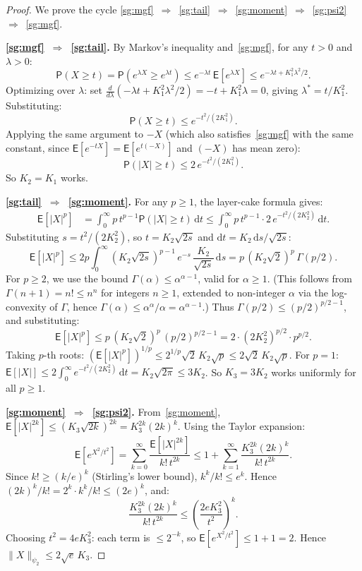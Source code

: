 \documentclass[14pt]{extarticle}
\theoremstyle{plain}
\theoremstyle{definition}
\theoremstyle{remark}
\newcommand\expc{\mathsf{E}}
\newcommand\prb{\mathsf{P}}
\newcommand{\dd}{\mathrm{d}}
\begin{document}
\begin{proof}
We prove the cycle \ref{sg:mgf}~$\Rightarrow$~\ref{sg:tail}~$\Rightarrow$~\ref{sg:moment}~$\Rightarrow$~\ref{sg:psi2}~$\Rightarrow$~\ref{sg:mgf}.

\medskip\noindent\textbf{\ref{sg:mgf}~$\Rightarrow$~\ref{sg:tail}.} By Markov's inequality and~\ref{sg:mgf}, for any $t > 0$ and $\lambda > 0$:
\[
\prb(X \geqslant t) = \prb(e^{\lambda X} \geqslant e^{\lambda t}) \leqslant e^{-\lambda t}\,\expc[e^{\lambda X}] \leqslant e^{-\lambda t + K_1^2\lambda^2/2}.
\]
Optimizing over $\lambda$: set $\frac{d}{d\lambda}(-\lambda t + K_1^2\lambda^2/2) = -t + K_1^2\lambda = 0$, giving $\lambda^* = t/K_1^2$. Substituting:
\[
\prb(X \geqslant t) \leqslant e^{-t^2/(2K_1^2)}.
\]
Applying the same argument to $-X$ (which also satisfies~\ref{sg:mgf} with the same constant, since $\expc[e^{-tX}] = \expc[e^{t(-X)}]$ and $(-X)$ has mean zero):
\[
\prb(|X| \geqslant t) \leqslant 2\,e^{-t^2/(2K_1^2)}.
\]
So $K_2 = K_1$ works.

\medskip\noindent\textbf{\ref{sg:tail}~$\Rightarrow$~\ref{sg:moment}.} For any $p \geqslant 1$, the layer-cake formula gives:
\begin{align}
\expc[|X|^p] &= \int_0^\infty p\,t^{p-1}\prb(|X| \geqslant t)\,\dd t \leqslant \int_0^\infty p\,t^{p-1} \cdot 2\,e^{-t^2/(2K_2^2)}\,\dd t. \label{eq:layercake}
\end{align}
Substituting $s = t^2/(2K_2^2)$, so $t = K_2\sqrt{2s}$ and $\dd t = K_2\,\dd s/\sqrt{2s}$:
\[
\expc[|X|^p] \leqslant 2p \int_0^\infty (K_2\sqrt{2s})^{p-1}\,e^{-s}\,\frac{K_2}{\sqrt{2s}}\,\dd s = p\,(K_2\sqrt{2})^p\,\Gamma(p/2).
\]
For $p \geqslant 2$, we use the bound $\Gamma(\alpha) \leqslant \alpha^{\alpha-1}$, valid for $\alpha \geqslant 1$. (This follows from $\Gamma(n+1) = n! \leqslant n^n$ for integers $n \geqslant 1$, extended to non-integer $\alpha$ via the log-convexity of $\Gamma$, hence $\Gamma(\alpha) \leqslant \alpha^\alpha/\alpha = \alpha^{\alpha-1}$.) Thus $\Gamma(p/2) \leqslant (p/2)^{p/2-1}$, and substituting:
\[
\expc[|X|^p] \leqslant p\,(K_2\sqrt{2})^p\,(p/2)^{p/2-1} = 2\cdot(2K_2^2)^{p/2}\cdot p^{p/2}.
\]
Taking $p$-th roots: $(\expc[|X|^p])^{1/p} \leqslant 2^{1/p}\sqrt{2}\,K_2\sqrt{p} \leqslant 2\sqrt{2}\,K_2\sqrt{p}$. For $p = 1$: $\expc[|X|] \leqslant 2\int_0^\infty e^{-t^2/(2K_2^2)}\,\dd t = K_2\sqrt{2\pi} \leqslant 3K_2$. So $K_3 = 3K_2$ works uniformly for all $p \geqslant 1$.

\medskip\noindent\textbf{\ref{sg:moment}~$\Rightarrow$~\ref{sg:psi2}.} From~\ref{sg:moment}, $\expc[|X|^{2k}] \leqslant (K_3\sqrt{2k})^{2k} = K_3^{2k}(2k)^k$. Using the Taylor expansion:
\[
\expc\!\left[e^{X^2/t^2}\right] = \sum_{k=0}^{\infty} \frac{\expc[|X|^{2k}]}{k!\,t^{2k}} \leqslant 1 + \sum_{k=1}^{\infty} \frac{K_3^{2k}(2k)^k}{k!\,t^{2k}}.
\]
Since $k! \geqslant (k/e)^k$ (Stirling's lower bound), $k^k/k! \leqslant e^k$. Hence $(2k)^k/k! = 2^k\cdot k^k/k! \leqslant (2e)^k$, and:
\[
\frac{K_3^{2k}(2k)^k}{k!\,t^{2k}} \leqslant \left(\frac{2eK_3^2}{t^2}\right)^k.
\]
Choosing $t^2 = 4eK_3^2$: each term is $\leqslant 2^{-k}$, so $\expc[e^{X^2/t^2}] \leqslant 1 + 1 = 2$. Hence $\|X\|_{\psi_2} \leqslant 2\sqrt{e}\,K_3$.


\end{proof}
\end{document}
